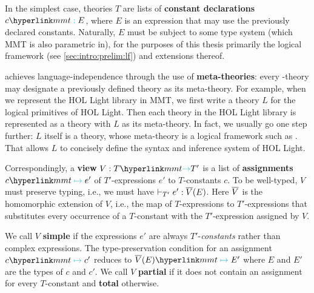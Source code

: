 In the simplest case, theories $T$ are lists of \textbf{constant declarations} $c\mmttp E$, where $E$ is an expression that may use the previously declared constants.
Naturally, $E$ must be subject to some type system (which MMT is also parametric in), for the purposes of this thesis primarily the logical framework \LF (see \autoref{sec:intro:prelim:lf}) and extensions thereof.

\mmt achieves language-independence through the use of \textbf{meta-theories}: every \mmt-theory may designate a previously defined theory as its meta-theory.
For example, when we represent the HOL Light library in MMT, we first write a theory $L$ for the logical primitives of HOL Light.
Then each theory in the HOL Light library is represented as a theory with $L$ as its meta-theory.
In fact, we usually go one step further: $L$ itself is a theory, whose meta-theory is a logical framework such as \LF.
That allows $L$ to concisely define the syntax and inference system of HOL Light. \medskip


Correspondingly, a \textbf{view} $V:\viewto T{T'}$ is a list of \textbf{assignments} $c \mmtass{e'}$ of $T'$-expressions $e'$ to $T$-constants $c$.
To be well-typed, $V$ must preserve typing, i.e., we must have $\vdash_{T'}e':\overline{V}(E)$.
Here $\overline{V}$ is the homomorphic extension of $V$, i.e., the map of $T$-expressions to $T'$-expressions that substitutes every occurrence of a $T$-constant with the $T'$-expression assigned by $V$.

We call $V$ \textbf{simple} if the expressions $e'$ are always $T'$-\emph{constants} rather than complex expressions.
The type-preservation condition for an assignment $c\mmtass c'$ reduces to $\ov{V}(E)\mmtass E'$ where $E$ and $E'$ are the types of $c$ and $c'$.
We call $V$ \textbf{partial} if it does not contain an assignment for every $T$-constant and \textbf{total} otherwise.

